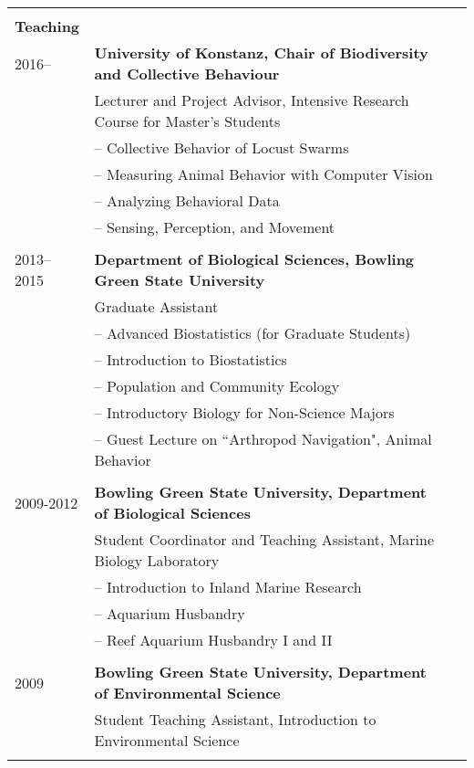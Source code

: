 \documentclass[letterpaper,10pt,oneside]{article}
\begin{document}
\begin{longtable}{@{} l p{5.3in}l}
     & \\
\Large{\textbf{Teaching}}  \vspace{5mm} \\
 \large{2016–}
    & \textbf{University of Konstanz, Chair of Biodiversity and Collective Behaviour} \\
     & Lecturer and Project Advisor, Intensive Research Course for Master's Students \\
   	 & – Collective Behavior of Locust Swarms \\
     & – Measuring Animal Behavior with Computer Vision \\
     & – Analyzing Behavioral Data \\
     & – Sensing, Perception, and Movement \\
     & \\
 \large{2013–2015}
 & \textbf{Department of Biological Sciences, Bowling Green State University} \\
 & Graduate Assistant \\
 & – Advanced Biostatistics (for Graduate Students)\\
 & – Introduction to Biostatistics \\
 & – Population and Community Ecology \\
 & – Introductory Biology for Non-Science Majors \\
 & – Guest Lecture on ``Arthropod Navigation", Animal Behavior \\
 & \\
 \large{2009-2012}
 & \textbf{Bowling Green State University, Department of Biological Sciences} \\
 & Student Coordinator and Teaching Assistant, Marine Biology Laboratory \\
 & – Introduction to Inland Marine Research \\
 & – Aquarium Husbandry \\
 & – Reef Aquarium Husbandry I and II \\
 & \\
 \large{2009}
 & \textbf{Bowling Green State University, Department of Environmental Science} \\
 & Student Teaching Assistant, Introduction to Environmental Science \\
 & \\
 

\end{longtable}
\end{document}
